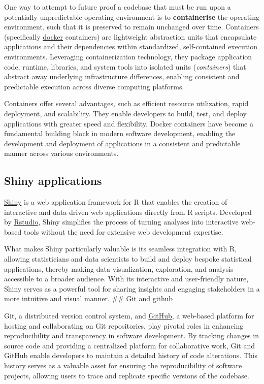\documentclass[
  8pt,
  a4paper]{article}
\begin{document}
One way to attempt to future proof a codebase that must be run upon a
potentially unpredictable operating environment is to
\textbf{containerise} the operating environment, such that it is
preserved to remain unchanged over time. Containers (specifically
\href{https://www.docker.com/}{docker} containers) are lightweight
abstraction units that encapsulate applications and their dependencies
within standardized, self-contained execution environments. Leveraging
containerization technology, they package application code, runtime,
libraries, and system tools into isolated units (\emph{containers}) that
abstract away underlying infrastructure differences, enabling consistent
and predictable execution across diverse computing platforms.

Containers offer several advantages, such as efficient resource
utilization, rapid deployment, and scalability. They enable developers
to build, test, and deploy applications with greater speed and
flexibility. Docker containers have become a fundamental building block
in modern software development, enabling the development and deployment
of applications in a consistent and predictable manner across various
environments.

\subsection{Shiny applications}\label{shiny-applications}

\href{https://shiny.posit.co/}{Shiny} is a web application framework for
R that enables the creation of interactive and data-driven web
applications directly from R scripts. Developed by
\href{https://posit.co/}{Rstudio}, Shiny simplifies the process of
turning analyses into interactive web-based tools without the need for
extensive web development expertise.

What makes Shiny particularly valuable is its seamless integration with
R, allowing statisticians and data scientists to build and deploy
bespoke statistical applications, thereby making data visualization,
exploration, and analysis accessible to a broader audience. With its
interactive and user-friendly nature, Shiny serves as a powerful tool
for sharing insights and engaging stakeholders in a more intuitive and
visual manner. \#\# Git and github

Git, a distributed version control system, and
\href{https://github.com/}{GitHub}, a web-based platform for hosting and
collaborating on Git repositories, play pivotal roles in enhancing
reproducibility and transparency in software development. By tracking
changes in source code and providing a centralized platform for
collaborative work, Git and GitHub enable developers to maintain a
detailed history of code alterations. This history serves as a valuable
asset for ensuring the reproducibility of software projects, allowing
users to trace and replicate specific versions of the codebase.
\end{document}
